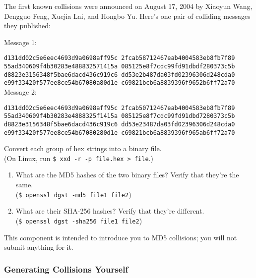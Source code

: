 \documentclass[letterpaper,12pt]{report}
\begin{document}
\medskip
 
The first known collisions were announced on August 17, 2004 by Xiaoyun Wang, Dengguo Feng, Xuejia Lai, and Hongbo Yu. Here's one pair of colliding messages they published:

\medskip

Message 1:
 \smallskip
 
\texttt{d131dd02c5e6eec4693d9a0698aff95c 2fcab58712467eab4004583eb8fb7f89\\
55ad340609f4b30283e488832571415a 085125e8f7cdc99fd91dbdf280373c5b\\
d8823e3156348f5bae6dacd436c919c6 dd53e2b487da03fd02396306d248cda0\\
e99f33420f577ee8ce54b67080a80d1e c69821bcb6a8839396f9652b6ff72a70}\\

Message 2:
\smallskip

\texttt{d131dd02c5e6eec4693d9a0698aff95c 2fcab50712467eab4004583eb8fb7f89\\
55ad340609f4b30283e4888325f1415a 085125e8f7cdc99fd91dbd7280373c5b\\
d8823e3156348f5bae6dacd436c919c6 dd53e23487da03fd02396306d248cda0\\
e99f33420f577ee8ce54b67080280d1e c69821bcb6a8839396f965ab6ff72a70}
 
 \medskip
 
Convert each group of hex strings into a binary file.\\
(On Linux, run \texttt{\$ xxd -r -p file.hex > file}.)
 
 \begin{enumerate}
 \item What are the MD5 hashes of the two binary files?  Verify that they're the same.\\
(\texttt{\$ openssl dgst -md5 file1 file2})
 
 \item What are their SHA-256 hashes?  Verify that they're different.\\
(\texttt{\$ openssl dgst -sha256 file1 file2})
 \end{enumerate}
 
This component is intended to introduce you to MD5 collisions; you will not submit anything for it.

\subsubsection{Generating Collisions Yourself}
\end{document}
